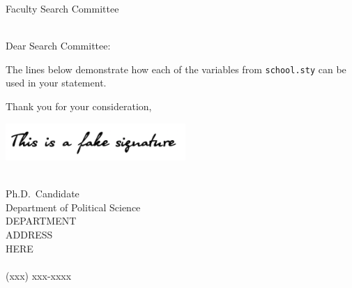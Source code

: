 \documentclass[12pt]{article}
\begin{document}
\thispagestyle{plain}

\pagestyle{empty}

Faculty Search Committee \\
\DepartmentName \\
\DepartmentAddress

Dear Search Committee:

\vfill

The lines below demonstrate how each of the variables from \texttt{school.sty} can be used in your statement.

\PositionName{}

\DepartmentName{}

\InstitutionName{}

\vfill

Thank you for your consideration,

\includegraphics[height=40pt]{../signature.png}

\Name{} \\
Ph.D.\ Candidate \\
Department of Political Science \\
DEPARTMENT \\
ADDRESS \\
HERE \\
 \\
(xxx) xxx-xxxx

\end{document}
